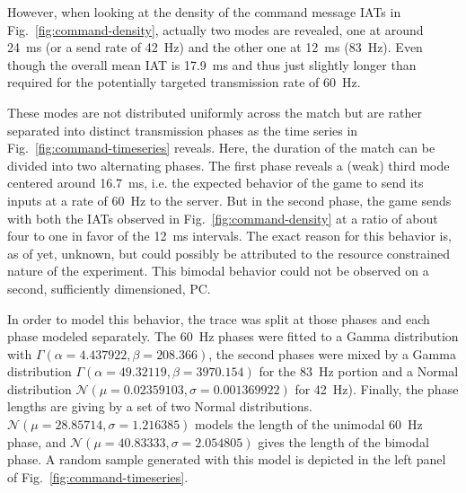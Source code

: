 However, when looking at the density of the command message \glspl{IAT} in Fig.~\ref{fig:command-density}, actually two modes are revealed, one at around \SI{24}{\milli\second} (or a send rate of \SI{42}{\hertz}) and the other one at \SI{12}{\milli\second} (\SI{83}{\hertz}). Even though the overall mean \gls{IAT} is \SI{17.9}{\milli\second} and thus just slightly longer than required for the potentially targeted transmission rate of \SI{60}{\hertz}.

These modes are not distributed uniformly across the match but are rather separated into distinct transmission phases as the time series in Fig.~\ref{fig:command-timeseries} reveals. Here, the duration of the match can be divided into two alternating phases. The first phase reveals a (weak) third mode centered around \SI{16.7}{\milli\second}, i.e. the expected behavior of the game to send its inputs at a rate of \SI{60}{\hertz} to the server. But in the second phase, the game sends with both the \glspl{IAT} observed in Fig.~\ref{fig:command-density} at a ratio of about four to one in favor of the \SI{12}{\milli\second} intervals. The exact reason for this behavior is, as of yet, unknown, but could possibly be attributed to the resource constrained nature of the experiment. This bimodal behavior could not be observed on a second, sufficiently dimensioned, PC.

In order to model this behavior, the trace was split at those phases and each phase modeled separately. The \SI{60}{\hertz} phases were fitted to a Gamma distribution with $\Gamma(\alpha = 4.437922, \beta = 208.366)$, the second phases were mixed by a Gamma distribution $\Gamma(\alpha = 49.32119, \beta = 3970.154)$ for the \SI{83}{\hertz} portion and a Normal distribution $\mathcal{N}(\mu = 0.02359103, \sigma = 0.001369922)$ for \SI{42}{\hertz}). Finally, the phase lengths are giving by a set of two Normal distributions. $\mathcal{N}(\mu = 28.85714, \sigma = 1.216385)$ models the length of the unimodal \SI{60}{\hertz} phase, and $\mathcal{N}(\mu = 40.83333, \sigma = 2.054805)$ gives the length of the bimodal phase. A random sample generated with this model is depicted in the left panel of Fig.~\ref{fig:command-timeseries}.


